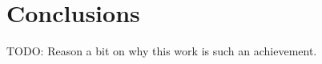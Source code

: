 \chapter{Conclusions}\label{cha:conclusions}

TODO: Reason a bit on why this work is such an achievement.